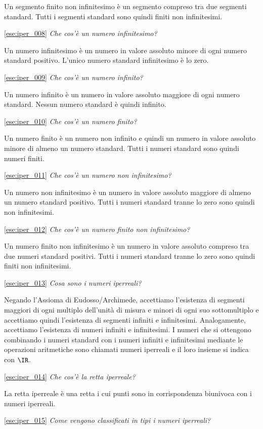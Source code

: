 Un segmento finito non infinitesimo è un segmento compreso tra due segmenti 
standard. Tutti i segmenti standard sono quindi finiti non infinitesimi.

\ref{ese:iper_008} 
\emph{Che cos'è un numero infinitesimo?}

Un numero infinitesimo è un numero in valore assoluto minore di ogni numero 
standard positivo. L'unico numero standard infinitesimo è lo zero.

\ref{ese:iper_009} 
\emph{Che cos'è un numero infinito?}

Un numero infinito è un numero in valore assoluto maggiore di ogni numero 
standard. Nessun numero standard è quindi infinito.

\ref{ese:iper_010} 
\emph{Che cos'è un numero finito?}

Un numero finito è un numero non infinito e quindi un numero in valore assoluto 
minore di almeno un numero standard. 
Tutti i numeri standard sono quindi numeri finiti.

\ref{ese:iper_011} 
\emph{Che cos'è un numero non infinitesimo?}

Un numero non infinitesimo è un numero in valore assoluto maggiore di almeno un 
numero standard positivo. Tutti i numeri standard tranne lo zero sono quindi 
non infinitesimi.

\ref{ese:iper_012} 
\emph{Che cos'è un numero finito non infinitesimo?}

Un numero finito non infinitesimo è un numero in valore assoluto compreso tra 
due numeri standard positivi. Tutti i numeri standard tranne lo zero sono 
quindi finiti non infinitesimi.

\ref{ese:iper_013} 
\emph{Cosa sono i numeri iperreali?}

Negando l'Assioma di Eudosso/Archimede, accettiamo l'esistenza di segmenti 
maggiori di ogni multiplo dell'unità di misura e minori di ogni suo 
sottomultiplo e accettiamo quindi l'esistenza di segmenti infiniti e 
infinitesimi. Analogamente, accettiamo l'esistenza di numeri infiniti e 
infinitesimi. I numeri che si ottengono combinando i numeri standard con i 
numeri infiniti e infinitesimi mediante le operazioni aritmetiche sono chiamati 
numeri iperreali e il loro insieme si indica con \(\IR\).

\ref{ese:iper_014} 
\emph{Che cos'è la retta iperreale?}

La retta iperreale è una retta i cui punti sono in corrispondenza biunivoca con 
i numeri iperreali.

\ref{ese:iper_015} 
\emph{Come vengono classificati in tipi i numeri iperreali?}

